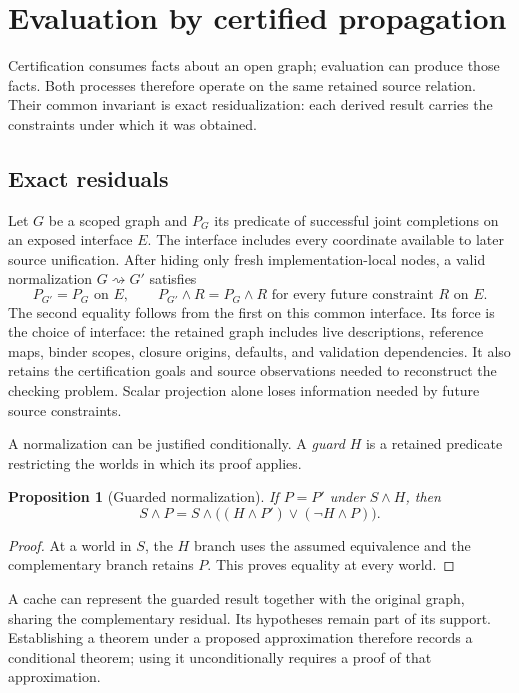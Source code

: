\documentclass[10pt,a4paper]{article}
\newtheorem{proposition}[definition]{Proposition}
\theoremstyle{remark}
\begin{document}
\section{Evaluation by certified propagation}
\label{sec:checking}
Certification consumes facts about an open graph; evaluation can produce those
facts. Both processes therefore operate on the same retained source relation.
Their common invariant is exact residualization: each derived result carries
the constraints under which it was obtained.

\subsection{Exact residuals}
\label{sec:residual}
Let $G$ be a scoped graph and $P_G$ its predicate of successful joint completions
on an exposed interface $E$. The interface includes every coordinate available
to later source unification. After hiding only fresh implementation-local
nodes, a valid normalization $G\rightsquigarrow G'$ satisfies
\begin{equation}\label{eq:residual}
 P_{G'}=P_G\text{ on }E,
 \qquad
 P_{G'}\land R=P_G\land R
       \text{ for every future constraint }R\text{ on }E.
\end{equation}
The second equality follows from the first on this common interface. Its force
is the choice of interface: the retained graph includes live descriptions,
reference maps, binder scopes, closure origins, defaults, and validation
dependencies. It also retains the certification goals and source observations
needed to reconstruct the checking problem. Scalar projection alone loses
information needed by future source constraints.

A normalization can be justified conditionally. A \emph{guard} $H$ is a retained
predicate restricting the worlds in which its proof applies.
\begin{proposition}[Guarded normalization]\label{prop:guarded}
If $P=P'$ under $S\land H$, then
\[
 S\land P
 =S\land\bigl((H\land P')\lor(\neg H\land P)\bigr).
\]
\end{proposition}
\begin{proof}
At a world in $S$, the $H$ branch uses the assumed equivalence and the
complementary branch retains $P$. This proves equality at every world.
\end{proof}

A cache can represent the guarded result together with the original graph,
sharing the complementary residual. Its hypotheses remain part of its
support. Establishing a theorem under a proposed approximation therefore
records a conditional theorem; using it unconditionally requires a proof of
that approximation.
\end{document}
